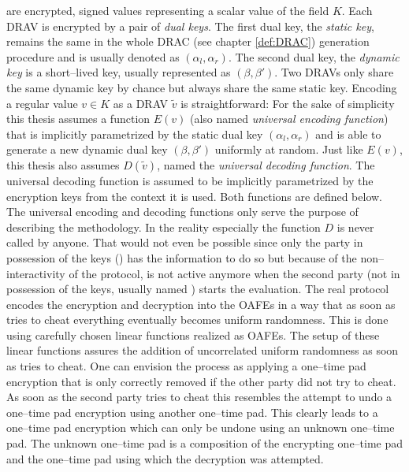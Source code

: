 %
%
\label{sec:drav}

 are encrypted, signed values
representing a scalar value of the field $K$. Each DRAV is encrypted by a pair
of \emph{dual keys}. The first dual key, the \emph{static key}, remains the same
in the whole DRAC (see chapter \ref{def:DRAC}) generation procedure and is
usually denoted as $(\alpha_l, \alpha_r)$. The second dual key, the
\emph{dynamic key} is a short--lived key, usually represented as $(\beta,
\beta')$. Two DRAVs only share the same dynamic key by chance but always share
the same static key. Encoding a regular value $v \in K$ as a DRAV
$\widetilde{v}$ is straightforward: For the sake of simplicity this thesis
assumes a function $E(v)$ (also named \emph{universal encoding function}) that
is implicitly parametrized by the static dual key $(\alpha_l, \alpha_r)$ and is
able to generate a new dynamic dual key $(\beta, \beta')$ uniformly at random.
Just like $E(v)$, this thesis also assumes $D(\widetilde{v})$, named the
\emph{universal decoding function}. The universal decoding function is assumed
to be implicitly parametrized by the encryption keys from the context it is
used. Both functions are defined below.  The universal encoding and decoding
functions only serve the purpose of describing the methodology. In the reality
especially the function $D$ is never called by anyone. That would not even be
possible since only the party in possession of the keys (\JWpOne{}) has the
information to do so but because of the non--interactivity of the protocol,
\JWpOne{} is not active anymore when the second party (not in possession of the
keys, usually named \JWpTwo{}) starts the evaluation. The real protocol encodes
the encryption and decryption into the OAFEs in a way that as soon as \JWpTwo{}
tries to cheat everything eventually becomes uniform randomness. This is done
using carefully chosen linear functions realized as OAFEs. The setup of these
linear functions assures the addition of uncorrelated uniform randomness as soon
as \JWpTwo{} tries to cheat. One can envision the process as applying a
one--time pad encryption that is only correctly removed if the other party did
not try to cheat. As soon as the second party tries to cheat this resembles the
attempt to undo a one--time pad encryption using another one--time pad. This
clearly leads to a one--time pad encryption which can only be undone using an
unknown one--time pad. The unknown one--time pad is a composition of the
encrypting one--time pad and the one--time pad using which the decryption was
attempted.

